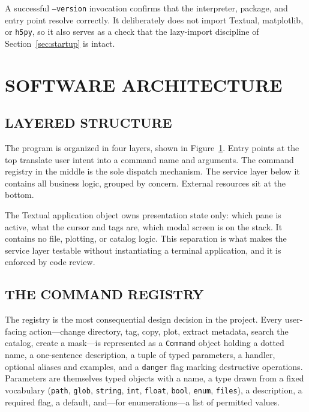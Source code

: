 \documentclass[tm]{ornltm}
\begin{document}
A successful \texttt{--version} invocation confirms that the interpreter,
package, and entry point resolve correctly. It deliberately does not import
Textual, matplotlib, or \texttt{h5py}, so it also serves as a check that the
lazy-import discipline of Section~\ref{sec:startup} is intact.

\section{SOFTWARE ARCHITECTURE}
\label{sec:arch}

\subsection{LAYERED STRUCTURE}

The program is organized in four layers, shown in Figure~\ref{fig:arch}. Entry
points at the top translate user intent into a command name and arguments. The
command registry in the middle is the sole dispatch mechanism. The service layer
below it contains all business logic, grouped by concern. External resources sit
at the bottom.

\begin{figure}[ht]
  \centering
  \resizebox{\textwidth}{!}{}
  \label{fig:arch}
\end{figure}

The Textual application object owns presentation state only: which pane is
active, what the cursor and tags are, which modal screen is on the stack. It
contains no file, plotting, or catalog logic. This separation is what makes the
service layer testable without instantiating a terminal application, and it is
enforced by code review.

\subsection{THE COMMAND REGISTRY}
\label{sec:registry}

The registry is the most consequential design decision in the project. Every
user-facing action---change directory, tag, copy, plot, extract metadata, search
the catalog, create a mask---is represented as a \texttt{Command} object holding
a dotted name, a one-sentence description, a tuple of typed parameters, a
handler, optional aliases and examples, and a \texttt{danger} flag marking
destructive operations. Parameters are themselves typed objects with a name, a
type drawn from a fixed vocabulary (\texttt{path}, \texttt{glob},
\texttt{string}, \texttt{int}, \texttt{float}, \texttt{bool}, \texttt{enum},
\texttt{files}), a description, a required flag, a default, and---for
enumerations---a list of permitted values.
\end{document}
